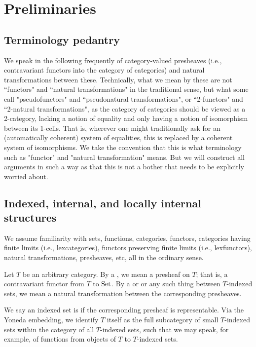 \section{Preliminaries}

\subsection{Terminology pedantry}
We speak in the following frequently of category-valued presheaves (i.e., contravariant functors into the category of categories) and natural transformations between these. Technically, what we mean by these are not ``functors" and ``natural transformations" in the traditional sense, but what some call "pseudofunctors" and ``pseudonatural transformations", or ``2-functors" and ``2-natural transformations", as the category of categories should be viewed as a 2-category, lacking a notion of equality and only having a notion of isomorphism between its 1-cells. That is, wherever one might traditionally ask for an (automatically coherent) system of equalities, this is replaced by a coherent system of isomorphisms. We take the convention that this is what terminology such as "functor" and "natural transformation" means. But we will construct all arguments in such a way as that this is not a bother that needs to be explicitly worried about. 

\subsection{Indexed, internal, and locally internal structures}
We assume familiarity with sets, functions, categories, functors, categories having finite limits (i.e., lexcategories), functors preserving finite limits (i.e., lexfunctors), natural transformations, presheaves, etc, all in the ordinary sense.

Let $T$ be an arbitrary category. By a , we mean a presheaf on $T$; that is, a contravariant functor from $T$ to $\mathrm{Set}$. By a  or  or any such thing between $T$-indexed sets, we mean a natural transformation between the corresponding presheaves.

We say an indexed set is  if the corresponding presheaf is representable. Via the Yoneda embedding, we identify $T$ itself as the full subcategory of small $T$-indexed sets within the category of all $T$-indexed sets, such that we may speak, for example, of functions from objects of $T$ to $T$-indexed sets.

